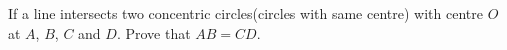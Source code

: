 If a line intersects two concentric circles(circles with same centre) with centre $O$ at $A$, $B$, $C$ and $D$. Prove that $AB = CD$.